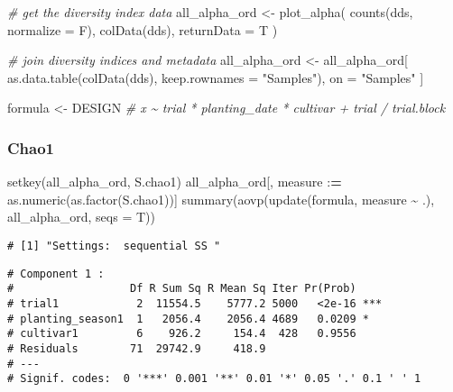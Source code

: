 \documentclass[
]{article}
\newenvironment{Shaded}{\begin{snugshade}}{\end{snugshade}}
\newcommand{\AttributeTok}[1]{\textcolor[rgb]{0.77,0.63,0.00}{#1}}
\newcommand{\CommentTok}[1]{\textcolor[rgb]{0.56,0.35,0.01}{\textit{#1}}}
\newcommand{\ErrorTok}[1]{\textcolor[rgb]{0.64,0.00,0.00}{\textbf{#1}}}
\newcommand{\FunctionTok}[1]{\textcolor[rgb]{0.00,0.00,0.00}{#1}}
\newcommand{\NormalTok}[1]{#1}
\newcommand{\OtherTok}[1]{\textcolor[rgb]{0.56,0.35,0.01}{#1}}
\newcommand{\SpecialCharTok}[1]{\textcolor[rgb]{0.00,0.00,0.00}{#1}}
\newcommand{\StringTok}[1]{\textcolor[rgb]{0.31,0.60,0.02}{#1}}
\begin{document}
\begin{Shaded}
\begin{Highlighting}[]
\CommentTok{\# get the diversity index data}
\NormalTok{all\_alpha\_ord }\OtherTok{\textless{}{-}} \FunctionTok{plot\_alpha}\NormalTok{(}
  \FunctionTok{counts}\NormalTok{(dds, }\AttributeTok{normalize =}\NormalTok{ F),}
  \FunctionTok{colData}\NormalTok{(dds),}
  \AttributeTok{returnData =}\NormalTok{ T}
\NormalTok{)}

\CommentTok{\# join diversity indices and metadata}
\NormalTok{all\_alpha\_ord }\OtherTok{\textless{}{-}}\NormalTok{ all\_alpha\_ord[}
  \FunctionTok{as.data.table}\NormalTok{(}\FunctionTok{colData}\NormalTok{(dds), }\AttributeTok{keep.rownames =} \StringTok{"Samples"}\NormalTok{), }
\NormalTok{  on }\OtherTok{=} \StringTok{"Samples"}
\NormalTok{]}

\NormalTok{formula }\OtherTok{\textless{}{-}}\NormalTok{ DESIGN }\CommentTok{\# x \textasciitilde{} trial * planting\_date * cultivar + trial / trial.block}
\end{Highlighting}
\end{Shaded}

\hypertarget{chao1}{%
\subsubsection{Chao1}\label{chao1}}

\begin{Shaded}
\begin{Highlighting}[]
\FunctionTok{setkey}\NormalTok{(all\_alpha\_ord, S.chao1)}
\NormalTok{all\_alpha\_ord[, measure }\SpecialCharTok{:}\ErrorTok{=} \FunctionTok{as.numeric}\NormalTok{(}\FunctionTok{as.factor}\NormalTok{(S.chao1))]}
\FunctionTok{summary}\NormalTok{(}\FunctionTok{aovp}\NormalTok{(}\FunctionTok{update}\NormalTok{(formula, measure }\SpecialCharTok{\textasciitilde{}}\NormalTok{ .), all\_alpha\_ord, }\AttributeTok{seqs =}\NormalTok{ T))}
\end{Highlighting}
\end{Shaded}

\begin{verbatim}
# [1] "Settings:  sequential SS "
\end{verbatim}

\begin{verbatim}
# Component 1 :
#                  Df R Sum Sq R Mean Sq Iter Pr(Prob)    
# trial1            2  11554.5    5777.2 5000   <2e-16 ***
# planting_season1  1   2056.4    2056.4 4689   0.0209 *  
# cultivar1         6    926.2     154.4  428   0.9556    
# Residuals        71  29742.9     418.9                  
# ---
# Signif. codes:  0 '***' 0.001 '**' 0.01 '*' 0.05 '.' 0.1 ' ' 1
\end{verbatim}
\end{document}
